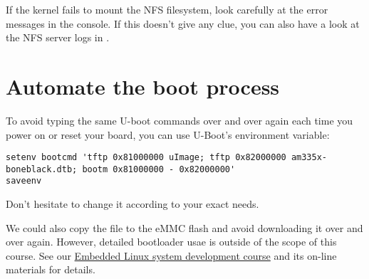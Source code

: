 If the kernel fails to mount the NFS filesystem, look carefully at the
error messages in the console. If this doesn't give any clue, you can
also have a look at the NFS server logs in .

\section{Automate the boot process}

To avoid typing the same U-boot commands over and over again each time
you power on or reset your board, you can use U-Boot's 
environment variable:

{\scriptsize
\begin{verbatim}
setenv bootcmd 'tftp 0x81000000 uImage; tftp 0x82000000 am335x-boneblack.dtb; bootm 0x81000000 - 0x82000000'
saveenv
\end{verbatim}
}

Don't hesitate to change it according to your exact needs.

We could also copy the  file to the eMMC flash and avoid
downloading it over and over again. However, detailed bootloader
usae is outside of the scope of this course. See our
\href{http://free-electrons.com/training/embedded-linux/}{Embedded
Linux system development course} and its on-line materials for
details.
